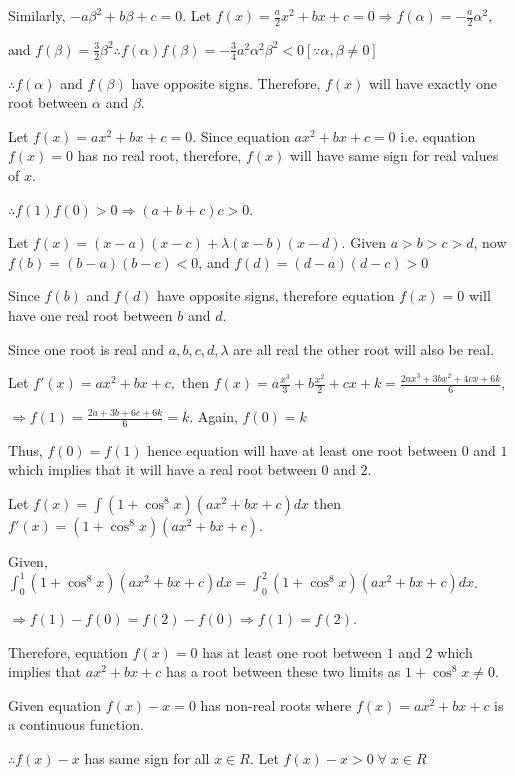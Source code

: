   Similarly, $-a\beta^2 + b\beta + c = 0$. Let $f(x) = \frac{a}{2}x^2 + bx + c = 0\Rightarrow f(\alpha) =
  -\frac{a}{2}\alpha^2$,

  and $f(\beta) = \frac{3}{2}\beta^2$$\therefore f(\alpha)f(\beta) = -\frac{3}{4}a^2\alpha^2\beta^2 < 0
  [\because \alpha,\beta \ne 0]$

  $\therefore f(\alpha)$ and $f(\beta)$ have opposite signs. Therefore, $f(x)$ will have exactly
  one root between $\alpha$ and $\beta$.
\item Let $f(x) = ax^2 + bx + c = 0$. Since equation $ax^2 + bx + c = 0$ i.e. equation $f(x) = 0$ has no
  real root, therefore, $f(x)$ will have same sign for real values of $x$.

  $\therefore f(1)f(0) > 0 \Rightarrow (a + b + c)c > 0$.
\item Let $f(x) = (x - a)(x - c) + \lambda (x - b)(x - d)$. Given $a > b > c > d$, now $f(b) = (b - a)(b -
  c) < 0$, and $f(d) = (d - a)(d - c) > 0$

  Since $f(b)$ and $f(d)$ have opposite signs, therefore equation $f(x) = 0$ will have one real
  root between $b$ and $d$.

  Since one root is real and $a, b, c, d, \lambda$ are all real the other root will also be real.
\item Let $f'(x) = ax^2 + bx + c,$ then $f(x) = a\frac{x^3}{3} + b\frac{x^2}{2} + cx + k = \frac{2ax^3 +
  3bx^2 + 4cx + 6k}{6}$,

  $\Rightarrow f(1) = \frac{2a + 3b + 6c + 6k}{6} = k$. Again, $f(0) = k$

  Thus, $f(0) = f(1)$ hence equation will have at least one root between $0$ and $1$ which implies
  that it will have a real root between $0$ and $2$.
\item Let $f(x) = \displaystyle\int (1 + \cos^8x)(ax^2 + bx + c)dx$ then $f'(x) = (1 + \cos^8x)(ax^2 + bx + c)$.

  Given, $\displaystyle\int_0^1 (1 + \cos^8 x)(ax^2 + bx + c)dx = \int_0^2 (1 + \cos^8 x)(ax^2 + bx + c)dx$.

  $\Rightarrow f(1) - f(0) = f(2) - f(0) \Rightarrow f(1) = f(2)$.

  Therefore, equation $f(x) = 0$ has at least one root between $1$ and $2$ which implies that
  $ax^2 + bx + c$ has a root between these two limits as $1 + \cos^8x \ne 0$.
\item Given equation $f(x) - x = 0$ has non-real roots where $f(x) = ax^2 + bx + c$ is a continuous function.

  $\therefore f(x) - x$  has same sign for all $x \in R$. Let $f(x) - x > 0\;\forall\;x \in R$

